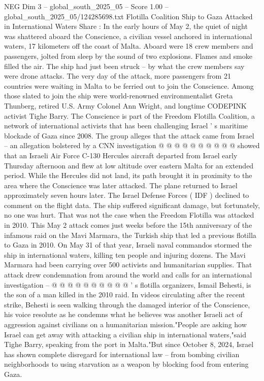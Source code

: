 \begin{textsample}{NEG Dim 3 – global\_south\_2025\_05 – Score 1.00 – global\_south\_2025\_05/124285698.txt}  \label{ex:f3_neg_227}
Flotilla Coalition Ship to Gaza Attacked in International Waters Share : In the early hours of May 2, the quiet of night was shattered aboard the Conscience, a civilian vessel anchored in international waters, 17 kilometers off the coast of Malta.
Aboard were 18 crew members and passengers, jolted from sleep by the sound of two explosions.
Flames and smoke filled the air.
The ship had just been struck -- by what the crew members say were drone attacks.
The very day of the attack, more passengers from 21 countries were waiting in Malta to be ferried out to join the Conscience.
Among those slated to join the ship were world-renowned environmentalist Greta Thunberg, retired U.S.
Army Colonel Ann Wright, and longtime CODEPINK activist Tighe Barry.
The Conscience is part of the Freedom Flotilla Coalition, a network of international activists that has been challenging Israel ' s maritime blockade of Gaza since 2008.
The group alleges that the attack came from Israel -- an allegation bolstered by a CNN investigation @ @ @ @ @ @ @ @ @ @ showed that an Israeli Air Force C-130 Hercules aircraft departed from Israel early Thursday afternoon and flew at low altitude over eastern Malta for an extended period.
While the Hercules did not land, its path brought it in proximity to the area where the Conscience was later attacked.
The plane returned to Israel approximately seven hours later.
The Israel Defense Forces ( IDF ) declined to comment on the flight data.
The ship suffered significant damage, but fortunately, no one was hurt.
That was not the case when the Freedom Flotilla was attacked in 2010.
This May 2 attack comes just weeks before the 15th anniversary of the infamous raid on the Mavi Marmara, the Turkish ship that led a previous flotilla to Gaza in 2010.
On May 31 of that year, Israeli naval commandos stormed the ship in international waters, killing ten people and injuring dozens.
The Mavi Marmara had been carrying over 500 activists and humanitarian supplies.
That attack drew condemnation from around the world and calls for an international investigation -- @ @ @ @ @ @ @ @ @ @ ' s flotilla organizers, Ismail Behesti, is the son of a man killed in the 2010 raid.
In videos circulating after the recent strike, Behesti is seen walking through the damaged interior of the Conscience, his voice resolute as he condemns what he believes was another Israeli act of aggression against civilians on a humanitarian mission."People are asking how Israel can get away with attacking a civilian ship in international waters,"said Tighe Barry, speaking from the port in Malta."But since October 8, 2024, Israel has shown complete disregard for international law -- from bombing civilian neighborhoods to using starvation as a weapon by blocking food from entering Gaza.

\end{textsample}
